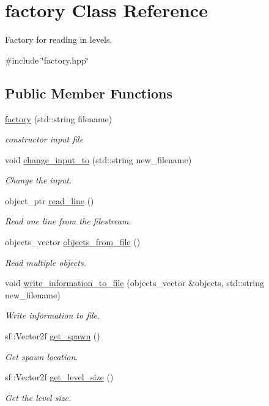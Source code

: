 \hypertarget{classfactory}{}\section{factory Class Reference}
\label{classfactory}


Factory for reading in levels.  




{\ttfamily \#include \char`\"{}factory.\+hpp\char`\"{}}

\subsection*{Public Member Functions}
\begin{DoxyCompactItemize}
\item 
\hyperlink{classfactory_af422815046ef8b9e95a4d8cb747fc43f}{factory} (std\+::string filename)
\begin{DoxyCompactList}\small\item\em constructor input file \end{DoxyCompactList}\item 
void \hyperlink{classfactory_a9e164a8fbb65188de99c39d55d7cc384}{change\+\_\+input\+\_\+to} (std\+::string new\+\_\+filename)
\begin{DoxyCompactList}\small\item\em Change the input. \end{DoxyCompactList}\item 
object\+\_\+ptr \hyperlink{classfactory_a82385866bc910c1b3a3e82d56487dd24}{read\+\_\+line} ()
\begin{DoxyCompactList}\small\item\em Read one line from the filestream. \end{DoxyCompactList}\item 
objects\+\_\+vector \hyperlink{classfactory_afb2fad4ac9b0f39b1bfc3f3fc8d218b6}{objects\+\_\+from\+\_\+file} ()
\begin{DoxyCompactList}\small\item\em Read multiple objects. \end{DoxyCompactList}\item 
void \hyperlink{classfactory_af17f2a44d75cf8ccf712384341c2fcde}{write\+\_\+information\+\_\+to\+\_\+file} (objects\+\_\+vector \&objects, std\+::string new\+\_\+filename)
\begin{DoxyCompactList}\small\item\em Write information to file. \end{DoxyCompactList}\item 
sf\+::\+Vector2f \hyperlink{classfactory_a3c3a039b8f76a947267dbe659166550b}{get\+\_\+spawn} ()
\begin{DoxyCompactList}\small\item\em Get spawn location. \end{DoxyCompactList}\item 
sf\+::\+Vector2f \hyperlink{classfactory_af9bb026273b34fc032ca5ac73d457611}{get\+\_\+level\+\_\+size} ()
\begin{DoxyCompactList}\small\item\em Get the level size. \end{DoxyCompactList}\end{DoxyCompactItemize}
